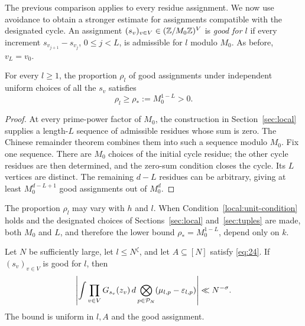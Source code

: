 The previous comparison applies to every residue assignment.  We now
use avoidance to obtain a stronger estimate for assignments compatible
with the designated cycle.  An assignment
$(s_v)_{v\in V}\in(\mathbb Z/M_0\mathbb Z)^V$ is \emph{good for $l$} if every
increment $s_{v_{j+1}}-s_{v_j}$, $0\le j<L$, is admissible for $l$
modulo $M_0$.  As before, $v_L=v_0$.

\begin{lemma}\label{transfer:good-assignments}
For every $l\ge1$, the proportion $\rho_l$ of good assignments under
independent uniform choices of all the $s_v$ satisfies
\[
 \rho_l\ge\rho_*:=M_0^{1-L}>0.
\]
\end{lemma}

\begin{proof}
At every prime-power factor of $M_0$, the construction in
Section~\ref{sec:local} supplies a length-$L$ sequence of admissible
residues whose sum is zero.  The Chinese remainder theorem combines them
into such a sequence modulo $M_0$.
Fix one sequence.  There are $M_0$ choices of the initial cycle residue;
the other cycle residues are then determined, and the zero-sum condition
closes the cycle.  Its $L$ vertices are distinct.  The remaining $d-L$
residues can be arbitrary, giving at least $M_0^{d-L+1}$ good assignments
out of $M_0^d$.
\end{proof}

The proportion $\rho_l$ may vary with $h$ and $l$. When
Condition~\eqref{local:unit-condition} holds and the designated choices of
Sections~\ref{sec:local} and~\ref{sec:tuples} are made, both $M_0$ and $L$,
and therefore the lower bound $\rho_*=M_0^{1-L}$, depend only on $k$.

\begin{proposition}\label{transfer:cancellation}
Let $N$ be sufficiently large, let $l\le N^\zeta$, and let
$A\subseteq[N]$ satisfy \eqref{eq:24}.  If $(s_v)_{v\in V}$ is good
for $l$, then
\begin{equation}\label{eq:29}
 \left|
  \int\prod_{v\in V}G_{s_v}(z_v)\,
    d\bigotimes_{p\in\mathcal P_N}
       (\mu_{l,p}-\varepsilon_{l,p})
 \right|\ll N^{-\sigma}.
\end{equation}
The bound is uniform in $l,A$ and the good assignment.
\end{proposition}

